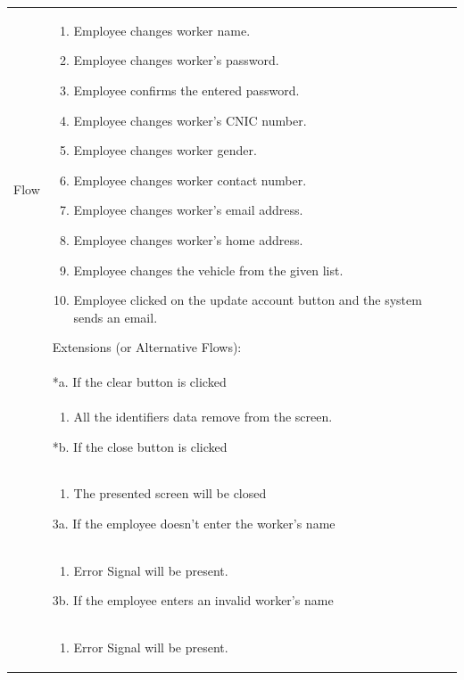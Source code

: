 \documentclass[12pt,a4paper]{report}
\begin{document}
\begin{tabular}{ | m{3cm} | m{12cm}| } \hline
Flow &
\begin{enumerate}
\item  Employee changes worker name.
\item  Employee changes worker's password.
\item  Employee confirms the entered password.
\item  Employee changes worker's CNIC number.
\item Employee changes worker gender. 
\item Employee changes worker contact number. 
\item Employee changes worker's email address.
\item Employee changes worker's home address.
\item Employee changes the vehicle from the given list. 
 \item Employee clicked on the update account button and the system sends an email.
\end{enumerate}

Extensions (or Alternative Flows):\\
& *a. If the clear button is clicked \\
& \begin{enumerate}
		\item All the identifiers data remove from the screen.
	\end{enumerate}
*b. If the close button is clicked\\
&	\begin{enumerate}
		\item The presented screen will be closed
	\end{enumerate}
3a. If the employee doesn't enter the worker's name \\ 	
&	\begin{enumerate}
		\item Error Signal will be present.
	\end{enumerate}
3b. If the employee enters an invalid worker's name \\ 	
&	\begin{enumerate}
		\item Error Signal will be present.
	\end{enumerate}
\\\hline
\end{tabular}
\end{document}
